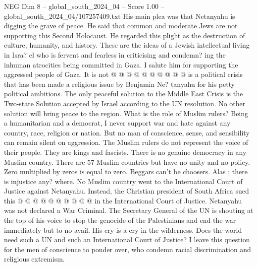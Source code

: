 \begin{textsample}{NEG Dim 8 – global\_south\_2024\_04 – Score 1.00 – global\_south\_2024\_04/107257409.txt}
His main plea was that Netanyahu is digging the grave of peace.
He said that common and moderate Jews are not supporting this Second Holocaust.
He regarded this plight as the destruction of culture, humanity, and history.
These are the ideas of a Jewish intellectual living in Isra? el who is fervent and fearless in criticising and condemn? ing the inhuman atrocities being committed in Gaza.
I salute him for supporting the aggressed people of Gaza.
It is not @ @ @ @ @ @ @ @ @ @ is a political crisis that has been made a religious issue by Benjamin Ne? tanyahu for his petty political ambitions.
The only peaceful solution to the Middle East Crisis is the Two-state Solution accepted by Israel according to the UN resolution.
No other solution will bring peace to the region.
What is the role of Muslim rulers?
Being a humanitarian and a democrat, I never support war and hate against any country, race, religion or nation.
But no man of conscience, sense, and sensibility can remain silent on aggression.
The Muslim rulers do not represent the voice of their people.
They are kings and fascists.
There is no genuine democracy in any Muslim country.
There are 57 Muslim countries but have no unity and no policy.
Zero multiplied by zeros is equal to zero.
Beggars can't be choosers.
Alas ; there is injustice any? where.
No Muslim country went to the International Court of Justice against Netanyahu.
Instead, the Christian president of South Africa sued this @ @ @ @ @ @ @ @ @ @ in the International Court of Justice.
Netanyahu was not declared a War Criminal.
The Secretary General of the UN is shouting at the top of his voice to stop the genocide of the Palestinians and end the war immediately but to no avail.
His cry is a cry in the wilderness.
Does the world need such a UN and such an International Court of Justice?
I leave this question for the men of conscience to ponder over, who condemn racial discrimination and religious extremism.

\end{textsample}
